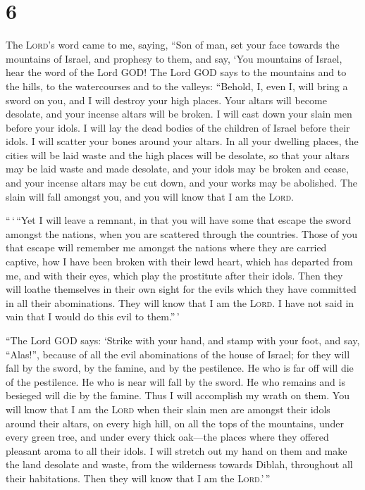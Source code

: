 \hypertarget{section-5}{%
\section{6}\label{section-5}}

 The \textsc{Lord}'s word came to me, saying,
 ``Son of man, set your face towards the mountains of
Israel, and prophesy to them,  and say, `You mountains of
Israel, hear the word of the Lord GOD! The Lord GOD says to the
mountains and to the hills, to the watercourses and to the valleys:
``Behold, I, even I, will bring a sword on you, and I will destroy your
high places.  Your altars will become desolate, and your
incense altars will be broken. I will cast down your slain men before
your idols.  I will lay the dead bodies of the children of
Israel before their idols. I will scatter your bones around your altars.
 In all your dwelling places, the cities will be laid
waste and the high places will be desolate, so that your altars may be
laid waste and made desolate, and your idols may be broken and cease,
and your incense altars may be cut down, and your works may be
abolished.  The slain will fall amongst you, and you will
know that I am the \textsc{Lord}.

 ``\,`\,``Yet I will leave a remnant, in that you will
have some that escape the sword amongst the nations, when you are
scattered through the countries.  Those of you that escape
will remember me amongst the nations where they are carried captive, how
I have been broken with their lewd heart, which has departed from me,
and with their eyes, which play the prostitute after their idols. Then
they will loathe themselves in their own sight for the evils which they
have committed in all their abominations.  They will know
that I am the \textsc{Lord}. I have not said in vain that I would do
this evil to them.''\,'

 ``The Lord GOD says: `Strike with your hand, and stamp
with your foot, and say, ``Alas!'', because of all the evil abominations
of the house of Israel; for they will fall by the sword, by the famine,
and by the pestilence.  He who is far off will die of the
pestilence. He who is near will fall by the sword. He who remains and is
besieged will die by the famine. Thus I will accomplish my wrath on
them.  You will know that I am the \textsc{Lord} when
their slain men are amongst their idols around their altars, on every
high hill, on all the tops of the mountains, under every green tree, and
under every thick oak---the places where they offered pleasant aroma to
all their idols.  I will stretch out my hand on them and
make the land desolate and waste, from the wilderness towards Diblah,
throughout all their habitations. Then they will know that I am the
\textsc{Lord}.'\,''

